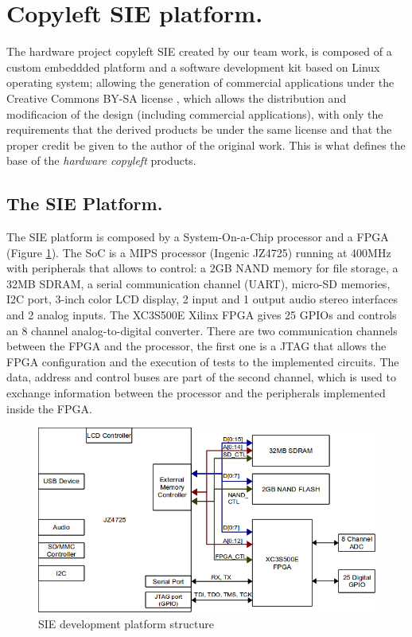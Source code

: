 \documentclass{sig-alternate}
\begin{document}
\section{Copyleft SIE platform.}
The hardware project copyleft SIE \cite{WSCC} created by our team work, is composed of a custom embeddded platform and a software development kit based on Linux operating system; allowing the generation of commercial applications under the Creative Commons BY-SA license \cite{CCb}, which allows the distribution and modificacion of the design (including commercial applications), with only the requirements that the derived products be under the same license and that the proper credit be given to the author of the original work. This is what defines the base of the \textit{hardware copyleft} products.

\subsection{The SIE Platform.}

The SIE platform is composed by a System-On-a-Chip processor and a FPGA (Figure \ref{SIE_arch}). The SoC is a MIPS processor (Ingenic JZ4725) running at 400MHz with peripherals that allows to control: a 2GB NAND memory for file storage, a 32MB SDRAM, a serial communication channel (UART), micro-SD memories, I2C port, 3-inch color LCD display, 2 input and 1 output audio stereo interfaces and 2 analog inputs. The XC3S500E Xilinx FPGA gives 25 GPIOs and controls an 8 channel analog-to-digital converter. There are two communication channels between the FPGA and the processor, the first one is a JTAG that allows the FPGA configuration and the execution of tests to the implemented circuits. The data, address and control buses are part of the second channel, which is used to exchange information between the processor and the peripherals implemented inside the FPGA.

\begin{figure}[htpb]
   \begin{center} \includegraphics[scale=.45]{./images/SIE_block_diagram.png}   \end{center}
    \caption{SIE development platform structure} \label{SIE_arch}
\end{figure}
\end{document}
